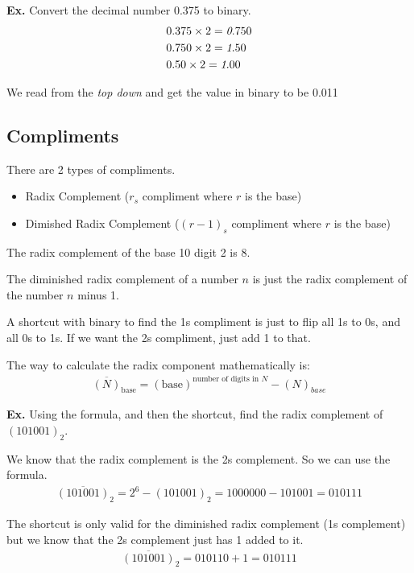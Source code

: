 \documentclass[12pt,letterpaper]{article} \usepackage{amsmath} \usepackage{graphicx}  \usepackage{longtable}  \usepackage{amssymb}
\begin{document}
        \begin{mdframed}
            \textbf{Ex. } Convert the decimal number 0.375 to binary.
            \begin{align*}
                &0.375\times 2 = \emph{0}.750\\
                &0.750\times 2=\emph{1}.50\\
                &0.50\times 2 = \emph{1}.00
            \end{align*}

            We read from the \emph{top down} and get the value in binary to be 0.011
        \end{mdframed}

        \subsection{Compliments}
        There are 2 types of compliments. 
        \begin{itemize}[noitemsep]
            \item Radix Complement ($r_s$ compliment where $r$ is the base)
            \item Dimished Radix Complement ($(r-1)_s$ compliment where $r$ is the base)
        \end{itemize}

        The radix complement of the base 10 digit 2 is 8.

        The diminished radix complement of a number $n$ is just the radix complement of the number $n$ minus 1. 

        A shortcut with binary to find the 1s compliment is just to flip all 1s to 0s, and all 0s to 1s. If we want the 2s compliment, just add 1 to that. 

        The way to calculate the radix component mathematically is:
        \begin{align*}
            \overline{(N)}_{\text{base}}=(\text{base})^{\text{number of digits in }N}-(N)_{base}
        \end{align*}

        \begin{mdframed}
            \textbf{Ex. } Using the formula, and then the shortcut, find the radix complement of $(101001)_2$.

            We know that the radix complement is the 2s complement. So we can use the formula. 
            \begin{align*}
                \overline{(101001)}_2 = 2^6 - (101001)_2 = 1000000 - 101001 = 010111
            \end{align*}

            The shortcut is only valid for the diminished radix complement (1s complement) but we know that the 2s complement just has 1 added to it. 
            \begin{align*}
                \overline{(101001)}_2 = 010110 + 1 = 010111
            \end{align*}
        \end{mdframed}
\end{document}
